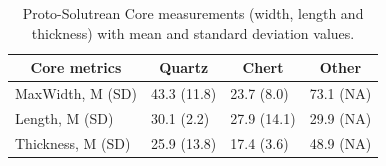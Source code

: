 \documentclass[12pt,twoside]{reedthesis}
\begin{document}
\begin{table}

\caption{\label{tab:unnamed-chunk-73}Proto-Solutrean Core measurements (width, length and thickness) with mean and standard deviation values.}
\centering
\begin{tabular}[t]{llll}
\toprule
\multicolumn{1}{c}{\textbf{Core metrics}} & \multicolumn{1}{c}{\textbf{Quartz}} & \multicolumn{1}{c}{\textbf{Chert}} & \multicolumn{1}{c}{\textbf{Other}}\\
\midrule
MaxWidth, M (SD) & 43.3 (11.8) & 23.7 (8.0) & 73.1 (NA)\\
Length, M (SD) & 30.1 (2.2) & 27.9 (14.1) & 29.9 (NA)\\
Thickness, M (SD) & 25.9 (13.8) & 17.4 (3.6) & 48.9 (NA)\\
\bottomrule
\end{tabular}
\end{table}
\end{document}
